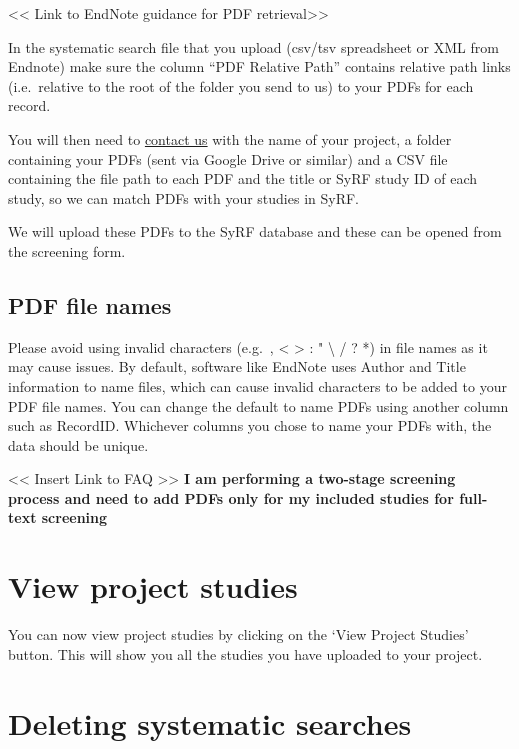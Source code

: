 \documentclass[
]{book}
\begin{document}
\textless{}\textless{} Link to EndNote guidance for PDF retrieval\textgreater{}\textgreater{}

In the systematic search file that you upload (csv/tsv spreadsheet or XML from Endnote) make sure the column ``PDF Relative Path'' contains relative path links (i.e.~relative to the root of the folder you send to us) to your PDFs for each record.

You will then need to \href{syrf.info@ed.ac.uk}{contact us} with the name of your project, a folder containing your PDFs (sent via Google Drive or similar) and a CSV file containing the file path to each PDF and the title or SyRF study ID of each study, so we can match PDFs with your studies in SyRF.

We will upload these PDFs to the SyRF database and these can be opened from the screening form.

\hypertarget{pdf-file-names}{%
\subsection{PDF file names}\label{pdf-file-names}}

Please avoid using invalid characters (e.g.~, \textless{} \textgreater{} : " \textbackslash{} / \textbar{} ? *) in file names as it may cause issues. By default, software like EndNote uses Author and Title information to name files, which can cause invalid characters to be added to your PDF file names. You can change the default to name PDFs using another column such as RecordID. Whichever columns you chose to name your PDFs with, the data should be unique.

\textless{}\textless{} Insert Link to FAQ \textgreater{}\textgreater{}
\textbf{I am performing a two-stage screening process and need to add PDFs only for my included studies for full-text screening}

\hypertarget{view-project-studies}{%
\section{View project studies}\label{view-project-studies}}

You can now view project studies by clicking on the `View Project Studies' button. This will show you all the studies you have uploaded to your project.

\hypertarget{deleting-systematic-searches}{%
\section{Deleting systematic searches}\label{deleting-systematic-searches}}
\end{document}
